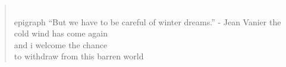 
\begin{verse}
\\ epigraph ``But we have to be careful of winter dreams.'' - Jean Vanier
the cold wind has come again \\
and i welcome the chance \\
to withdraw from this barren world
\end{verse}
